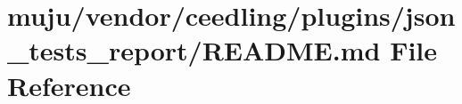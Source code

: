 \hypertarget{vendor_2ceedling_2plugins_2json__tests__report_2_r_e_a_d_m_e_8md}{}\section{muju/vendor/ceedling/plugins/json\+\_\+tests\+\_\+report/\+R\+E\+A\+D\+ME.md File Reference}
\label{vendor_2ceedling_2plugins_2json__tests__report_2_r_e_a_d_m_e_8md}
